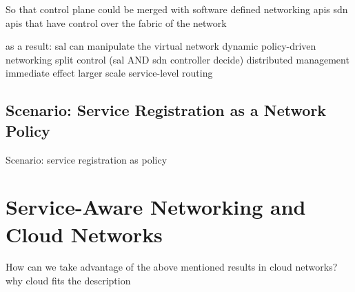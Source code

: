 \documentclass[12pt,a4paper,oneside]{article}
\begin{document}
So that control plane could be merged with software defined networking apis
sdn apis that have control over the fabric of the network

as a result: sal can manipulate the virtual network
dynamic policy-driven networking
split control (sal AND sdn controller decide)
distributed management
immediate effect
larger scale service-level routing

\subsection{Scenario: Service Registration as a Network Policy}
Scenario:
service registration as policy

\newpage
\section{Service-Aware Networking and Cloud Networks}
How can we take advantage of the above mentioned results in cloud networks?
why cloud fits the description

\end{document}
